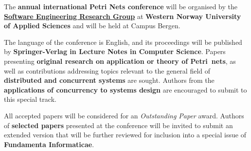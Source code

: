 \documentclass[10pt]{article}
\begin{document}
\noindent
The {\bf{} annual international Petri Nets conference} will be organised by the {\bf \href{https://www.hvl.no/en/research/group/software-engineering/}{Software Engineering Research Group}} at {\bf Western Norway University of Applied Sciences} and will be held at Campus Bergen.

%
\smallskip
\noindent
The language of the conference is English, and its proceedings will be published by
{\bf Springer-Verlag in Lecture Notes in Computer Science}.
Papers presenting {\bf original research on application or theory of Petri nets}, as well
as contributions addressing topics relevant to the general field of {\bf distributed and
concurrent systems} are sought. Authors from the {\bf applications of concurrency
to systems
design} are encouraged to submit to this special track.

\smallskip
\noindent
All accepted papers will be considered for an \textit{Outstanding
Paper} award. Authors of {\bf selected papers} presented at the conference will be invited
to submit an extended version that will be further reviewed for inclusion into a special
issue of {\bf Fundamenta Informaticae}.
\end{document}
